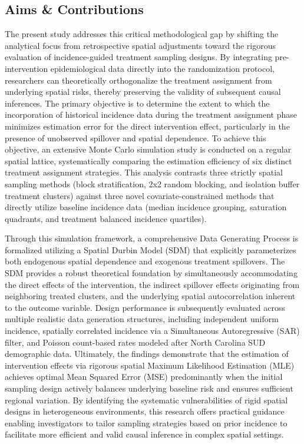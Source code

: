 \documentclass[11pt]{article}
\begin{document}
\subsection{Aims \& Contributions}

The present study addresses this critical methodological gap by shifting the analytical focus from retrospective spatial adjustments toward the rigorous evaluation of incidence-guided treatment sampling designs. By integrating pre-intervention epidemiological data directly into the randomization protocol, researchers can theoretically orthogonalize the treatment assignment from underlying spatial risks, thereby preserving the validity of subsequent causal inferences. The primary objective is to determine the extent to which the incorporation of historical incidence data during the treatment assignment phase minimizes estimation error for the direct intervention effect, particularly in the presence of unobserved spillover and spatial dependence. To achieve this objective, an extensive Monte Carlo simulation study is conducted on a regular spatial lattice, systematically comparing the estimation efficiency of six distinct treatment assignment strategies. This analysis contrasts three strictly spatial sampling methods (block stratification, 2x2 random blocking, and isolation buffer treatment clusters) against three novel covariate-constrained methods that directly utilize baseline incidence data (median incidence grouping, saturation quadrants, and treatment balanced incidence quartiles).

Through this simulation framework, a comprehensive Data Generating Process is formalized utilizing a Spatial Durbin Model (SDM) that explicitly parameterizes both endogenous spatial dependence and exogenous treatment spillovers. The SDM provides a robust theoretical foundation by simultaneously accommodating the direct effects of the intervention, the indirect spillover effects originating from neighboring treated clusters, and the underlying spatial autocorrelation inherent to the outcome variable. Design performance is subsequently evaluated across multiple realistic data generation structures, including independent uniform incidence, spatially correlated incidence via a Simultaneous Autoregressive (SAR) filter, and Poisson count-based rates modeled after North Carolina SUD demographic data. Ultimately, the findings demonstrate that the estimation of intervention effects via rigorous spatial Maximum Likelihood Estimation (MLE) achieves optimal Mean Squared Error (MSE) predominantly when the initial sampling design actively balances underlying baseline risk and ensures sufficient regional variation. By identifying the systematic vulnerabilities of rigid spatial designs in heterogeneous environments, this research offers practical guidance enabling investigators to tailor sampling strategies based on prior incidence to facilitate more efficient and valid causal inference in complex spatial settings.
\end{document}
